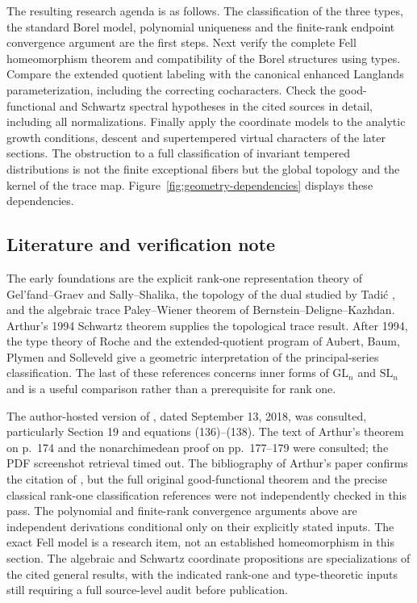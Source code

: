 The resulting research agenda is as follows. The classification of the three types, the standard Borel model, polynomial uniqueness and the finite-rank endpoint convergence argument are the first steps. Next verify the complete Fell homeomorphism theorem and compatibility of the Borel structures using types. Compare the extended quotient labeling with the canonical enhanced Langlands parameterization, including the correcting cocharacters. Check the good-functional and Schwartz spectral hypotheses in the cited sources in detail, including all normalizations. Finally apply the coordinate models to the analytic growth conditions, descent and supertempered virtual characters of the later sections. The obstruction to a full classification of invariant tempered distributions is not the finite exceptional fibers but the global topology and the kernel of the trace map. Figure~\ref{fig:geometry-dependencies} displays these dependencies.

\subsection{Literature and verification note}\label{subsec:geometry-literature}
The early foundations are the explicit rank-one representation theory of Gel'fand--Graev and Sally--Shalika, the topology of the dual studied by Tadi\'c \cite{Ta83}, and the algebraic trace Paley--Wiener theorem of Bernstein--Deligne--Kazhdan. Arthur's 1994 Schwartz theorem supplies the topological trace result. After 1994, the type theory of Roche \cite{Ro98} and the extended-quotient program of Aubert, Baum, Plymen and Solleveld \cite{ABPS14,ABPS17,ABPS19} give a geometric interpretation of the principal-series classification. The last of these references concerns inner forms of $\mathrm{GL}_n$ and $\mathrm{SL}_n$ and is a useful comparison rather than a prerequisite for rank one.

The author-hosted version of \cite{ABPS17}, dated September 13, 2018, was consulted, particularly Section 19 and equations (136)--(138). The text of Arthur's theorem on p.~174 and the nonarchimedean proof on pp.~177--179 were consulted; the PDF screenshot retrieval timed out. The bibliography of Arthur's paper confirms the citation of \cite{BDK86}, but the full original good-functional theorem and the precise classical rank-one classification references were not independently checked in this pass. The polynomial and finite-rank convergence arguments above are independent derivations conditional only on their explicitly stated inputs. The exact Fell model is a research item, not an established homeomorphism in this section. The algebraic and Schwartz coordinate propositions are specializations of the cited general results, with the indicated rank-one and type-theoretic inputs still requiring a full source-level audit before publication.
